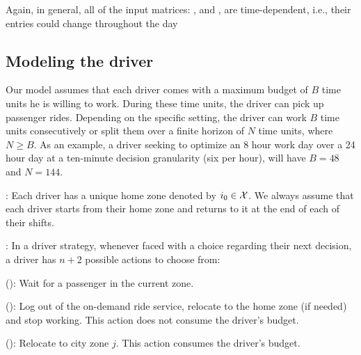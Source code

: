 Again, in general, all of the input matrices: %
{\empiricaltransitionmatrix}, {\traveltimematrix} and {\rewardsmatrix}, 
are time-dependent, i.e., their entries could change throughout the day


\subsection{Modeling the driver}
Our model assumes that 
each driver comes with a 
maximum budget of $B$ time units
he is willing to work. During these time units, the driver 
 can pick
up passenger rides. Depending on the specific setting, the driver can
work $B$ time units consecutively or split them 
over a finite horizon of $N$ time units, where $N \geq B$. 
As an example, a driver seeking to optimize an 8 hour work day over
a 24 hour day at a ten-minute decision granularity (six per hour), 
will have $B=48$ and $N=144$.


: 
Each driver has a unique home zone denoted by $i_0 \in \mathcal{X}$. 
We always assume that each driver starts from their home zone and returns to it
at the end of each of their shifts.

: 
In a driver strategy, whenever faced with a choice regarding their
  next decision, a driver has $n+2$ possible actions to choose from: 
\squishlist
    \item {\getpassenger} (\getpassengeraction): Wait for a passenger in the current zone. 
    \item {\gohome} (\gohomeaction): Log out of the on-demand ride service, relocate to the home zone (if needed) 
  and stop working.   This action does not consume the driver's budget.
    \item {\relocate} (\relocateaction): Relocate to city zone $j$.  This action consumes the driver's budget.
\squishend


